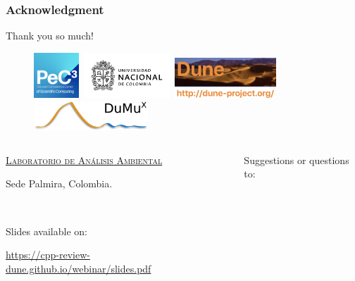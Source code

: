 \begin{frame}
	\frametitle{Acknowledgment}
	\begin{center}\Huge
		Thank you so much!
	\end{center}
	\begin{figure}[ht!]
		\centering
		\href{https://www.pec3.org}{\includegraphics[height=1.7cm]{pec3}}\,
		\href{https://unal.edu.co}{\includegraphics[height=1.7cm]{unal}}\,
		\href{https://dune-project.org}{\includegraphics[height=1.5cm]{dune-logo}}\,
		\href{https://dumux.org}{\includegraphics[height=1.1cm]{dumux}}
	\end{figure}
	\vfill
	\begin{columns}
		\begin{column}{0.5\textwidth}
			\textcolor{c++reviewduneblue!50!c++reviewduneverde}{\href{https://laboratorios.unal.edu.co/geslab2021/servicios-lab-unal/labs-palmira}{\textsc{Laboratorio de Análisis Ambiental}}}

			Sede Palmira, Colombia.

			\

			\textcolor{c++reviewduneblue}{Slides available on:}
			\begin{center}
				\href{https://cpp-review-dune.github.io/webinar/slides.pdf}{\url{https://cpp-review-dune.github.io/webinar/slides.pdf}}
			\end{center}
		\end{column}
		\hfill
		\begin{column}{0.5\textwidth}
			\begin{flushright}
				Suggestions or questions to:


\end{flushright}
\end{column}
\end{columns}
\end{frame}
